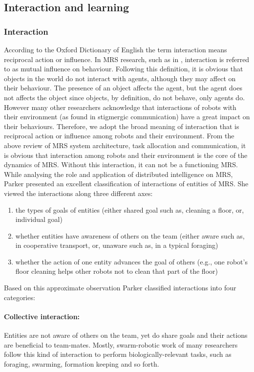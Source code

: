 \subsection*{Interaction and learning}
\label{bg:mrs:learn}
\subsubsection*{Interaction}
According to the Oxford Dictionary of English the term interaction means reciprocal action or influence. In MRS research, such as in \cite{Mataric1994}, interaction is referred to as mutual influence on behaviour. Following this definition, it is obvious that objects in the world do not interact with agents, although they may affect on their behaviour. The presence of an object affects the agent, but the agent does not affects the object since objects, by definition, do not behave, only agents do. However many other researchers acknowledge that interactions of robots with their environment (as found in stigmergic communication) have a great impact on their behaviours. Therefore, we adopt the broad meaning of interaction that is reciprocal action or influence among robots and their environment.
From the above review of MRS system architecture, task allocation and communication, it is obvious that interaction among robots and their environment is the core of the dynamics of MRS.
Without this interaction, it can not be a functioning MRS. 
While analysing the role and application of distributed intelligence on MRS, Parker \cite{Parker2008} presented an excellent classification of interactions of entities of MRS. She viewed the interactions along three different axes:
\begin{enumerate}
\item the types of goals of entities (either shared goal such as, cleaning a floor, or, individual goal)
\item whether entities have awareness of others on the team (either aware such as, in cooperative transport, or, unaware such as, in a typical foraging)
\item whether the action of one entity advances the goal of others (e.g., one robot's floor cleaning helps other robots not to clean that part of the floor)
\end{enumerate}
Based on this approximate observation Parker classified interactions into four categories:
\paragraph{Collective interaction:}
Entities are not aware of others on the team, yet do share goals and their actions are beneficial to team-mates. Mostly, swarm-robotic work of many researchers follow this kind of interaction to perform biologically-relevant tasks, such as foraging, swarming, formation keeping and so forth.
